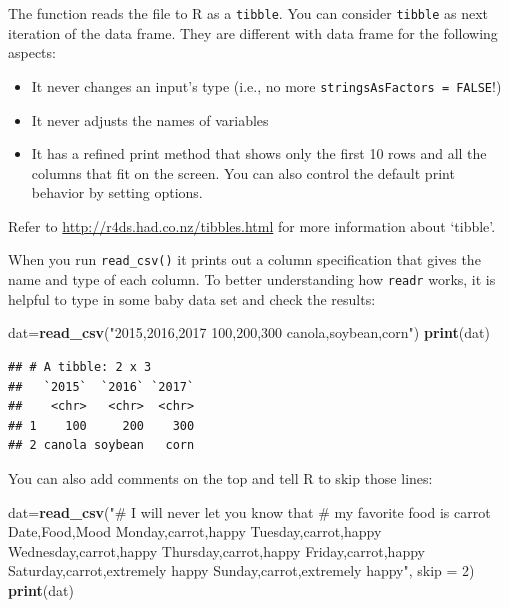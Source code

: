 \documentclass[12pt,]{krantz}
\newenvironment{Shaded}{\begin{snugshade}}{\end{snugshade}}
\newcommand{\KeywordTok}[1]{\textcolor[rgb]{0.13,0.29,0.53}{\textbf{{#1}}}}
\newcommand{\DataTypeTok}[1]{\textcolor[rgb]{0.13,0.29,0.53}{{#1}}}
\newcommand{\DecValTok}[1]{\textcolor[rgb]{0.00,0.00,0.81}{{#1}}}
\newcommand{\StringTok}[1]{\textcolor[rgb]{0.31,0.60,0.02}{{#1}}}
\newcommand{\NormalTok}[1]{{#1}}
\providecommand{\tightlist}{%
  \setlength{\itemsep}{0pt}\setlength{\parskip}{0pt}}
\theoremstyle{definition}
\theoremstyle{definition}
\theoremstyle{remark}
\begin{document}
The function reads the file to R as a \texttt{tibble}. You can consider
\texttt{tibble} as next iteration of the data frame. They are different
with data frame for the following aspects:

\begin{itemize}
\tightlist
\item
  It never changes an input's type (i.e., no more
  \texttt{stringsAsFactors\ =\ FALSE}!)
\item
  It never adjusts the names of variables
\item
  It has a refined print method that shows only the first 10 rows and
  all the columns that fit on the screen. You can also control the
  default print behavior by setting options.
\end{itemize}

Refer to \url{http://r4ds.had.co.nz/tibbles.html} for more information
about `tibble'.

When you run \texttt{read\_csv()} it prints out a column specification
that gives the name and type of each column. To better understanding how
\texttt{readr} works, it is helpful to type in some baby data set and
check the results:

\begin{Shaded}
\begin{Highlighting}[]
\NormalTok{dat=}\KeywordTok{read_csv}\NormalTok{(}\StringTok{"2015,2016,2017}
\StringTok{100,200,300}
\StringTok{canola,soybean,corn"}\NormalTok{)}
\KeywordTok{print}\NormalTok{(dat)}
\end{Highlighting}
\end{Shaded}

\begin{verbatim}
## # A tibble: 2 x 3
##   `2015`  `2016` `2017`
##    <chr>   <chr>  <chr>
## 1    100     200    300
## 2 canola soybean   corn
\end{verbatim}

You can also add comments on the top and tell R to skip those lines:

\begin{Shaded}
\begin{Highlighting}[]
\NormalTok{dat=}\KeywordTok{read_csv}\NormalTok{(}\StringTok{"# I will never let you know that}
\StringTok{          # my favorite food is carrot}
\StringTok{          Date,Food,Mood}
\StringTok{          Monday,carrot,happy}
\StringTok{          Tuesday,carrot,happy}
\StringTok{          Wednesday,carrot,happy}
\StringTok{          Thursday,carrot,happy}
\StringTok{          Friday,carrot,happy}
\StringTok{          Saturday,carrot,extremely happy}
\StringTok{          Sunday,carrot,extremely happy"}\NormalTok{, }\DataTypeTok{skip =} \DecValTok{2}\NormalTok{)}
\KeywordTok{print}\NormalTok{(dat)}
\end{Highlighting}
\end{Shaded}
\end{document}

